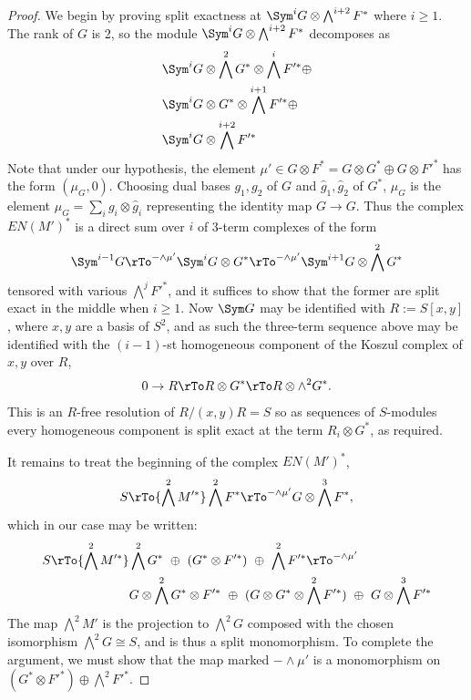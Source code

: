 \begin{proof}
We begin by proving split exactness at  
 $\Sym^{i} G \otimes \bigwedge^{i+2}  F^*$ where $i\geq 1$.
The rank of $G$ is 2, so the module
$ \Sym^{i} G \otimes \bigwedge^{i+2}  F^*$
decomposes as
\begin{align*}
&\Sym^{i} G \otimes \bigwedge^2 G^* \otimes \bigwedge^{i} F'^*\oplus \\
&\Sym^{i} G \otimes  G^*\otimes \bigwedge^{i+1} F'^* \oplus \\
&\Sym^{i} G \otimes  \bigwedge^{i+2} F'^* 
\end{align*}
Note that under our hypothesis, the element $\mu' \in G\otimes F^* = G\otimes G^* \oplus G\otimes F'^*$
has the form $(\mu_G, 0)$. Choosing dual bases $g_1,g_2$ of $G$ and $\widehat g_1,\widehat g_2$ of $G^*$,
$\mu_G$ is the element
 $\mu_G = \sum_i g_i\otimes \widehat g_i$
representing the identity map $G \to G$. Thus the complex
$EN(M')^*$ is a direct sum over $i$ of 3-term complexes of the form
$$
\Sym^{i-1} G 
\rTo^{-\wedge \mu'} 
\Sym^{i} G \otimes  G^*
\rTo^{-\wedge \mu'} 
\Sym^{i+1} G \otimes \bigwedge^2 G^* 
$$
tensored with various $\bigwedge^j F'^*$, and it suffices to show that the former are split exact in the middle
when
$i\geq 1$. Now $\Sym G$ may be identified with $R:= S[x,y]$, where $x,y$ are a basis of $S^2$, and
as such the three-term sequence above may be identified with the $(i-1)$-st homogeneous component 
of the Koszul complex of $x,y$ over $R$,
$$
0\to R \rTo R\otimes G^* \rTo R\otimes \wedge^2 G^*.
$$
This is an $R$-free resolution of  $R/(x,y)R = S$ so as sequences
of $S$-modules every homogeneous component is split exact at the term $R_i\otimes G^*$,
as required.

It remains to treat the beginning of the complex $EN(M')^*$,
$$
S \rTo{\bigwedge^2 M'^*} 
 \bigwedge^2 F^*
 \rTo^{-\wedge \mu'}
G\otimes \bigwedge^3 F^*,
$$
which in our case may be written:
\begin{align*}
S \rTo{\bigwedge^2 M'^*} 
 &\bigwedge^2 G^* \ \oplus\ (G^*\otimes F'^*)\ \oplus\ \bigwedge^2 F'^*
 \rTo^{-\wedge \mu'} \\
 &G\otimes \bigwedge^2 G^*\otimes F'^*\ \oplus\ (G\otimes G^*\otimes \bigwedge^2 F'^*)\ \oplus\ G\otimes \bigwedge^3 F'^*
\end{align*}
The map $\bigwedge^2 M'$ is the projection to $\bigwedge^2 G$ composed with the chosen isomorphism
$\bigwedge^2 G \cong S$, and is thus a split monomorphism. To complete the argument, we must show that
 the map marked $-\wedge \mu'$ is a monomorphism on $(G^*\otimes F'^*) \oplus \bigwedge^2 F'^*$.
 

\end{proof}

